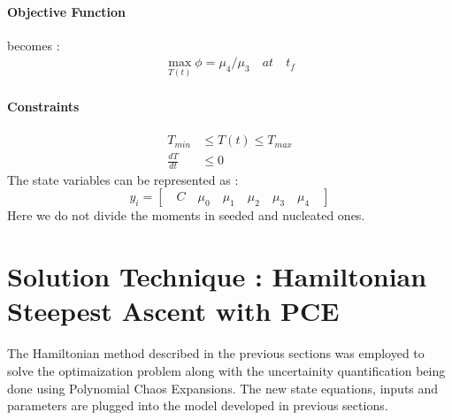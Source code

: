 \paragraph{Objective Function} becomes :
\begin{align}
\max_{T(t)}	\phi = \mu_{4}/\mu_{3} \quad at \quad t_{f} 
\end{align}
\paragraph{Constraints}
\begin{align}
T_{min} &\leqslant T(t) \leqslant T_{max} \\
\frac{dT}{dt} &\leqslant 0
\end{align}
The state variables can be represented as :
\begin{equation*}
y_{i} = \left[\quad C \quad \mu_{0} \quad \mu_{1} \quad \mu_{2} \quad \mu_{3}\quad \mu_{4} \quad\right]  
\end{equation*}
Here we do not divide the moments in seeded and nucleated ones. 

\section{Solution Technique : Hamiltonian Steepest Ascent with PCE}

The Hamiltonian method described in the previous sections was employed to solve the optimaization problem along with the uncertainity quantification being done using Polynomial Chaos Expansions. The new state equations, inputs and parameters are plugged into the model developed in previous sections.\\

